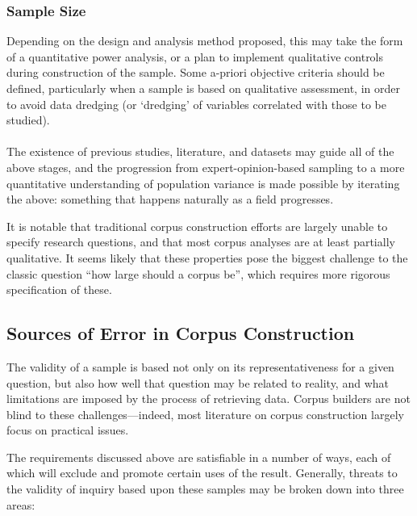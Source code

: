 \subsubsection{Sample Size}
Depending on the design and analysis method proposed, this may take the form of a quantitative power analysis, or a plan to implement qualitative controls during construction of the sample.  Some a-priori objective criteria should be defined, particularly when a sample is based on qualitative assessment, in order to avoid data dredging (or `dredging' of variables correlated with those to be studied).

\paragraph{}
The existence of previous studies, literature, and datasets may guide all of the above stages, and the progression from expert-opinion-based sampling to a more quantitative understanding of population variance is made possible by iterating the above: something that happens naturally as a field progresses.

It is notable that traditional corpus construction efforts are largely unable to specify research questions, and that most corpus analyses are at least partially qualitative.  It seems likely that these properties pose the biggest challenge to the classic question ``how large should a corpus be'', which requires more rigorous specification of these.






\subsection{Sources of Error in Corpus Construction}
The validity of a sample is based not only on its representativeness for a given question, but also how well that question may be related to reality, and what limitations are imposed by the process of retrieving data.
Corpus builders are not blind to these challenges---indeed, most literature on corpus construction largely focus on practical issues.



The requirements discussed above are satisfiable in a number of ways, each of which will exclude and promote certain uses of the result.  Generally, threats to the validity of inquiry based upon these samples may be broken down into three areas:

